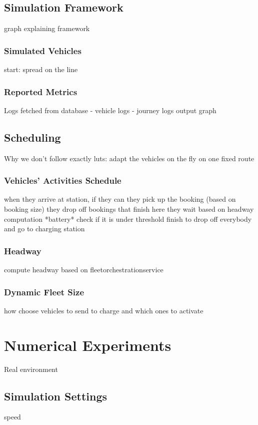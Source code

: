 \documentclass[12pt,a4paper]{article}
\begin{document}
\subsection{Simulation Framework}
graph explaining framework 

\subsubsection{Simulated Vehicles}
start: spread on the line

\subsubsection{Reported Metrics}
Logs fetched from database 
- vehicle logs
- journey logs
output graph

\subsection{Scheduling}
Why we don't follow exactly luts: adapt the vehicles on the fly on one fixed route
\subsubsection{Vehicles' Activities Schedule}
when they arrive at station, if they can they pick up the booking (based on booking size)
they drop off bookings that finish here
they wait based on headway computation
*battery* check if it is under threshold
finish to drop off everybody and go to charging station
\subsubsection{Headway}
compute headway based  on fleetorchestrationservice
\subsubsection{Dynamic Fleet Size}
how choose vehicles to send to charge and which ones to activate

\section{Numerical Experiments}
Real environment
\subsection{}
\subsection{Simulation Settings}
speed 
\end{document}
